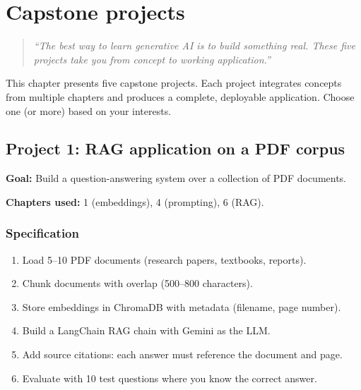 \chapter{Capstone projects}
\label{ch:capstone}

\begin{quote}
\emph{``The best way to learn generative AI is to build something real. These five projects take you from concept to working application.''}
\end{quote}

This chapter presents five capstone projects. Each project integrates concepts from multiple chapters and produces a complete, deployable application. Choose one (or more) based on your interests.

\section{Project 1: RAG application on a PDF corpus}

\textbf{Goal:} Build a question-answering system over a collection of PDF documents.

\textbf{Chapters used:} 1 (embeddings), 4 (prompting), 6 (RAG).

\subsection{Specification}

\begin{enumerate}
  \item Load 5--10 PDF documents (research papers, textbooks, reports).
  \item Chunk documents with overlap (500--800 characters).
  \item Store embeddings in ChromaDB with metadata (filename, page number).
  \item Build a LangChain RAG chain with Gemini as the LLM.
  \item Add source citations: each answer must reference the document and page.
  \item Evaluate with 10 test questions where you know the correct answer.
\end{enumerate}

